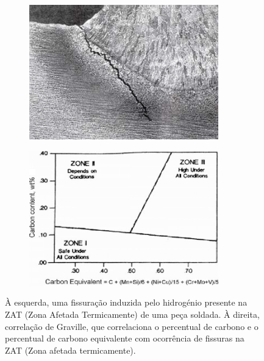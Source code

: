 \begin{figure}[htb]
    \centering
    \begin{subfigure}{.4\textwidth}
        \includegraphics[width = 0.9\textwidth]{Figures/Cap2/Cold_Cracking.png}
        \caption{}
        \label{fig:Fissuracao_1}
    \end{subfigure}%
    \begin{subfigure}{.4\textwidth}
        \centering
        \includegraphics[width = 0.9\textwidth]{Figures/Cap2/Graville_Diagram.png}
        \caption{}
        \label{fig:Graville}
    \end{subfigure}
    \caption[Fissuração induzida por hidrogénio e correlação de Graville]%
    {À esquerda, uma fissuração induzida pelo hidrogénio presente na ZAT (Zona Afetada Termicamente) de uma peça soldada. À direita, correlação de Graville, que correlaciona o percentual de carbono e o percentual de carbono equivalente com ocorrência de fissuras na ZAT (Zona afetada termicamente)\cite{Olson2007}. }
\end{figure}
